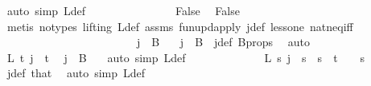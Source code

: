 \begin{isabellebody}
\ {\isacharparenleft}{\kern0pt}auto\ simp{\isacharcolon}{\kern0pt}\ L{\isacharprime}{\kern0pt}{\isacharunderscore}{\kern0pt}def{\isacharparenright}{\kern0pt}\isanewline
\ \ \ \ \ \ \ \ \ \ \ \ \isamarkupfalse%
\ \isamarkupfalse%
\ False\ \isamarkupfalse%
\ False\isanewline
\ \ \ \ \ \ \ \ \ \ \ \ \ \ \isamarkupfalse%
\ {\isacharparenleft}{\kern0pt}metis\ {\isacharparenleft}{\kern0pt}no{\isacharunderscore}{\kern0pt}types{\isacharcomma}{\kern0pt}\ lifting{\isacharparenright}{\kern0pt}\ L{\isacharprime}{\kern0pt}{\isacharunderscore}{\kern0pt}def\ assms{\isacharparenleft}{\kern0pt}{}{\isacharparenright}{\kern0pt}\ fun{\isacharunderscore}{\kern0pt}upd{\isacharunderscore}{\kern0pt}apply\ j{\isacharunderscore}{\kern0pt}def\ less{\isacharunderscore}{\kern0pt}one\ nat{\isacharunderscore}{\kern0pt}neq{\isacharunderscore}{\kern0pt}iff{\isacharparenright}{\kern0pt}\isanewline
\ \ \ \ \ \ \ \ \ \ \isamarkupfalse%
\isanewline
\ \ \ \ \ \ \ \ \ \ \isamarkupfalse%
\ \isamarkupfalse%
\ {\isachardoublequoteopen}j\ {\isasymin}\ B\ {}{\isachardoublequoteclose}\ \isamarkupfalse%
\ {\isacartoucheopen}j\ {\isasymnotin}\ B\ {}{\isacartoucheclose}\ j{\isacharunderscore}{\kern0pt}def\ B{\isacharunderscore}{\kern0pt}props\ \isamarkupfalse%
\ auto\isanewline
\isanewline
\ \ \ \ \ \ \ \ \ \ \isamarkupfalse%
\ \isamarkupfalse%
\ {\isachardoublequoteopen}L{\isacharprime}{\kern0pt}\ t\ j\ {\isacharequal}{\kern0pt}\ t{\isachardoublequoteclose}\ \isamarkupfalse%
\ {\isacartoucheopen}j\ {\isasymnotin}\ B\ {}{\isacartoucheclose}\ \isamarkupfalse%
\ {\isacharparenleft}{\kern0pt}auto\ simp{\isacharcolon}{\kern0pt}\ L{\isacharprime}{\kern0pt}{\isacharunderscore}{\kern0pt}def{\isacharparenright}{\kern0pt}\isanewline
\ \ \ \ \ \ \ \ \ \ \isamarkupfalse%
\ \isamarkupfalse%
\ {\isachardoublequoteopen}L{\isacharprime}{\kern0pt}\ s\ j\ {\isacharequal}{\kern0pt}\ s{\isachardoublequoteclose}\ \ {\isachardoublequoteopen}s\ {\isacharless}{\kern0pt}\ t\ {\isacharplus}{\kern0pt}\ {}{\isachardoublequoteclose}\ \ s\ \isamarkupfalse%
\ j{\isacharunderscore}{\kern0pt}def\ that\ \isamarkupfalse%
\ {\isacharparenleft}{\kern0pt}auto\ simp{\isacharcolon}{\kern0pt}\ L{\isacharprime}{\kern0pt}{\isacharunderscore}{\kern0pt}def{\isacharparenright}{\kern0pt}\isanewline

\end{isabellebody}
